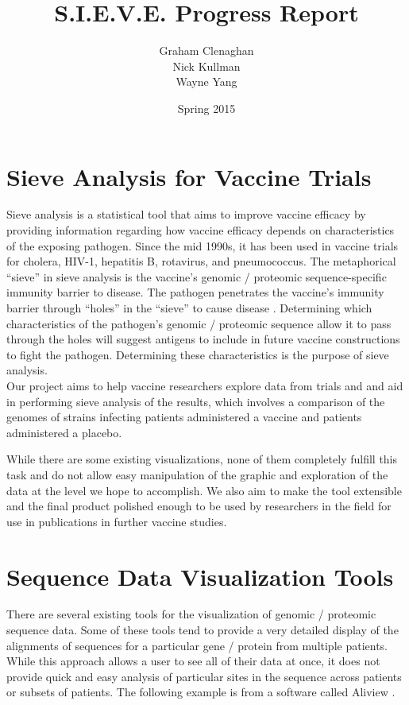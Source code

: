\documentclass{article}
\begin{document}
\title{S.I.E.V.E. Progress Report}
\author{Graham Clenaghan \\ Nick Kullman \\ Wayne Yang}
\date{Spring 2015}
\maketitle

\section{Sieve Analysis for Vaccine Trials}

Sieve analysis is a statistical tool that aims to improve vaccine efficacy by providing information regarding how vaccine efficacy depends on characteristics of the exposing pathogen. 
Since the mid 1990s, it has been used in vaccine trials for cholera, HIV-1, hepatitis B, rotavirus, and pneumococcus. 
The metaphorical ``sieve'' in sieve analysis is the vaccine's genomic / proteomic sequence-specific immunity barrier to disease. The pathogen penetrates the vaccine's immunity barrier through ``holes'' in the ``sieve'' to cause disease \cite{gilbert2001sieve}.
Determining which characteristics of the pathogen's genomic / proteomic sequence allow it to pass through the holes will suggest antigens to include in future vaccine constructions to fight the pathogen.
Determining these characteristics is the purpose of sieve analysis. 
\\
Our project aims to help vaccine researchers explore data from trials and and aid in performing sieve analysis of the results, which involves a comparison of the genomes of strains infecting patients administered a vaccine and patients administered a placebo.

While there are some existing visualizations, none of them completely fulfill this task and do not allow easy manipulation of the graphic and exploration of the data at the level we hope to accomplish. We also aim to make the tool extensible and the final product polished enough to be used by researchers in the field for use in publications in further vaccine studies.

\section{Sequence Data Visualization Tools}

There are several existing tools for the visualization of genomic / proteomic sequence data.  Some of these tools tend to provide a very detailed display of the alignments of sequences for a particular gene / protein from multiple patients.  While this approach allows a user to see all of their data at once, it does not provide quick and easy analysis of particular sites in the sequence across patients or subsets of patients.  The following example is from a software called Aliview \cite{aliview}.
\end{document}
